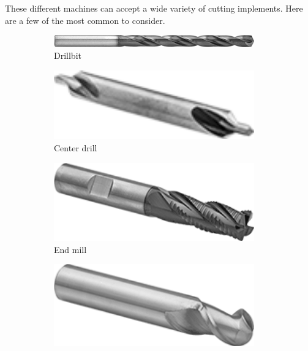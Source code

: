 \documentclass[10pt,letterpaper]{book}
\begin{document}
 These different machines can accept a wide variety of cutting implements. Here are a few of the most common to consider.
 
 \begin{figure}[H]
	\centering
	\begin{subfigure}[b]{.19\linewidth}
		\includegraphics[width=0.95\textwidth]{imgs/drillbit.png}
		\caption{Drillbit}
	\end{subfigure} \begin{subfigure}[b]{.19\linewidth}
		\includegraphics[width=0.95\textwidth]{imgs/centerdrill.png}
		\caption{Center drill}
	\end{subfigure}	\begin{subfigure}[b]{.19\linewidth}
		\includegraphics[width=0.95\textwidth]{imgs/endmill.png}
		\caption{End mill}
	\end{subfigure}	\begin{subfigure}[b]{.19\linewidth}
		\includegraphics[width=0.95\textwidth]{imgs/ball_endmill.png}

\end{subfigure}
\end{figure}
\end{document}
